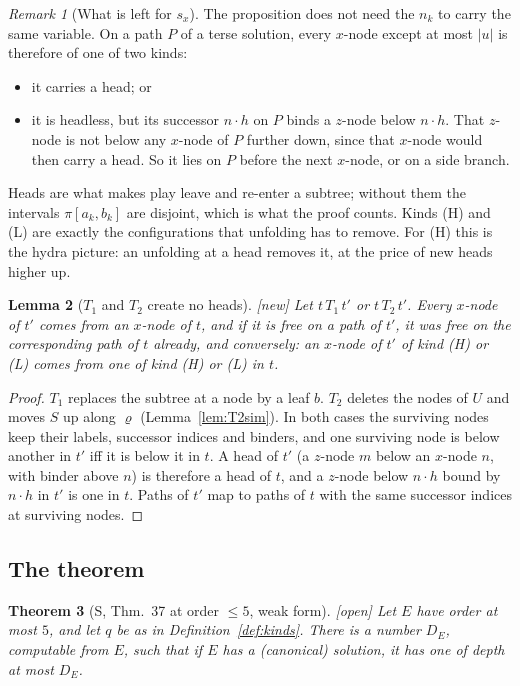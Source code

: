 \documentclass[11pt]{article}
\newcommand{\suc}[2]{#1{\cdot}#2}
\newcommand{\iv}[2]{\pi[#1,#2]}
\newcommand{\New}{\textsf{[new]}}
\newcommand{\Open}{\textsf{\color{red!60!black}[open]}}
\theoremstyle{plain}
\newtheorem{theorem}{Theorem}[section]
\newtheorem{lemma}[theorem]{Lemma}
\theoremstyle{definition}
\theoremstyle{remark}
\newtheorem{remark}[theorem]{Remark}
\begin{document}
\begin{remark}[What is left for $s_x$]\label{rem:leftsx}
The proposition does not need the $n_k$ to carry the same variable.
On a path $P$ of a terse solution, every $x$-node except at most $|u|$
is therefore of one of two kinds:
\begin{itemize}
\item[(H)] it carries a head; or
\item[(L)] it is headless, but its successor $\suc nh$ on $P$ binds a
  $z$-node below $\suc nh$.  That $z$-node is not below any $x$-node of
  $P$ further down, since that $x$-node would then carry a head.  So it
  lies on $P$ before the next $x$-node, or on a side branch.
\end{itemize}
Heads are what makes play leave and re-enter a subtree; without them
the intervals $\iv{a_k}{b_k}$ are disjoint, which is what the proof
counts.  Kinds (H) and (L) are exactly the configurations that
unfolding has to remove.  For (H) this is the hydra picture: an
unfolding at a head removes it, at the price of new heads higher up.
\end{remark}

\begin{lemma}[$T_1$ and $T_2$ create no heads]\label{lem:monoheads}
\New{} Let $t\,T_1\,t'$ or $t\,T_2\,t'$.  Every $x$-node of $t'$ comes
from an $x$-node of $t$, and if it is free on a path of $t'$, it was
free on the corresponding path of $t$ already, and conversely: an
$x$-node of $t'$ of kind (H) or (L) comes from one of kind (H) or (L)
in $t$.
\end{lemma}
\begin{proof}
$T_1$ replaces the subtree at a node by a leaf $b$.  $T_2$ deletes the
nodes of $U$ and moves $S$ up along $\varrho$
(Lemma~\ref{lem:T2sim}).  In both cases the surviving nodes keep their
labels, successor indices and binders, and one surviving node is below
another in $t'$ iff it is below it in $t$.  A head of $t'$ (a $z$-node
$m$ below an $x$-node $n$, with binder above $n$) is therefore a head
of $t$, and a $z$-node below $\suc nh$ bound by $\suc nh$ in $t'$ is one
in $t$.  Paths of $t'$ map to paths of $t$ with the same successor
indices at surviving nodes.
\end{proof}

\subsection{The theorem}

\begin{theorem}[S, Thm.~37 at order $\le5$, weak form]\label{thm:small}
\Open{} Let $E$ have order at most $5$, and let $q$ be as in
Definition~\ref{def:kinds}.  There is a number $D_E$, computable from
$E$, such that if $E$ has a (canonical) solution, it has one of depth at
most $D_E$.
\end{theorem}
\end{document}
